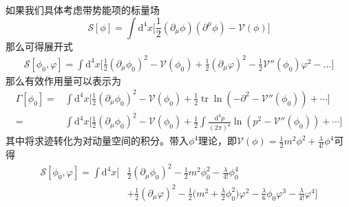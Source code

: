 如果我们具体考虑带势能项的标量场
\begin{equation}
    \mathcal{S}[\phi] = \int \mathrm{d}^4x \Big[\frac{1}{2} (\partial_\mu \phi)(\partial^\mu \phi) - \mathscr{V}(\phi)\Big]
\end{equation}
那么可得展开式
\begin{equation}
\begin{split}
        \mathcal{S}[\phi_0,\varphi]  = \int \mathrm{d}^4x \Big[ \frac{1}{2}(\partial_\mu \phi_0)^2- \mathscr{V}(\phi_0)+\frac{1}{2}(\partial_\mu \varphi)^2-\frac{1}{2}\mathscr{V}''(\phi_0)\varphi^2 - \dots\Big]
\end{split}
\end{equation}
那么有效作用量可以表示为
\begin{equation}
\begin{split}
       \Gamma[\phi_0] =& \int\mathrm{d}^4x \Big[ \frac{1}{2}(\partial_\mu \phi_0)^2- \mathscr{V}(\phi_0) +\frac{1}{2}\operatorname{tr}\ln\left( -\partial^2 -\mathscr{V}''(\phi_0) \right)+\cdots\Big] \\
       =&\int\mathrm{d}^4x \Big[ \frac{1}{2}(\partial_\mu \phi_0)^2- \mathscr{V}(\phi_0) +\frac{1}{2}\int\frac{\mathrm{d}^4p}{(2\pi)^4}\ln\left( p^2 -\mathscr{V}''(\phi_0) \right)+\cdots\Big]
\end{split}
\end{equation}
其中将求迹转化为对动量空间的积分。带入$\phi^4$理论，即$\mathscr{V}(\phi)  = \frac{1}{2}m^2\phi^2 + \frac{\lambda}{4!}\phi^4$可得
\begin{equation}
    \begin{split}
        \mathcal{S}[\phi_0,\varphi] = \int \mathrm{d}^4x \Big[&\frac{1}{2}(\partial_\mu \phi_0)^2-\frac{1}{2}m^2\phi_0^2-\frac{\lambda}{4!}\phi_0^4\\
        &+\frac{1}{2}(\partial_\mu \varphi)^2-\frac{1}{2}\Big(m^2+\frac{\lambda}{2}\phi_0^2\Big)\varphi^2 -\frac{\lambda}{6}\phi_0\varphi^3 - \frac{\lambda}{4!}\varphi^4\Big]
    \end{split}
\end{equation}
